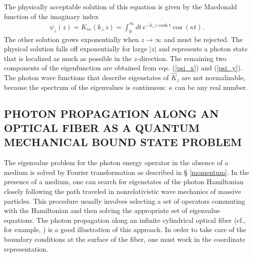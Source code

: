 \documentclass[11pt]{article}
\begin{document}
The physically acceptable solution of this equation is given by the
Macdonald function of the imaginary index
\begin{eqnarray}
 \psi_z(z) = K_{i\kappa}(k_{\perp}z) = \int_0^{\infty}\!dt\,
 e^{-k_{\perp}z\cosh t}\cos(\kappa t).\label{macdon}
\end{eqnarray}
The other solution grows exponentially when $z\to\infty$ and must be
rejected. The physical solution falls off exponentially for large
$\vert{z}\vert$ and represents a photon state that is localized as much as
possible in the $z$-direction. The remaining two components of the
eigenfunction are obtained from eqs. (\ref{psi_x}) and (\ref{psi_y}). The
photon wave functions that describe eigenstates of ${\hat K}_z$ are not
normalizable, because the spectrum of the eigenvalues is continuous:
$\kappa$ can be any real number.

\subsection[PROPAGATION IN OPTICAL FIBER]{PHOTON PROPAGATION ALONG AN OPTICAL FIBER AS A QUANTUM MECHANICAL BOUND STATE PROBLEM}
The eigenvalue problem for the photon energy operator in the absence of a
medium is solved by Fourier transformation as described in \S
\ref{momentum}. In the presence of a medium, one can search for eigenstates
of the photon Hamiltonian closely following the path traveled in
nonrelativistic wave mechanics of massive particles. This procedure usually
involves selecting a set of operators commuting with the Hamiltonian and
then solving the appropriate set of eigenvalue equations. The photon
propagation along an infinite cylindrical optical fiber (cf., for example,
\cite{IBB_94}) is a good illustration of this approach. In order to take
care of the boundary conditions at the surface of the fiber, one must work
in the coordinate representation.
\end{document}
